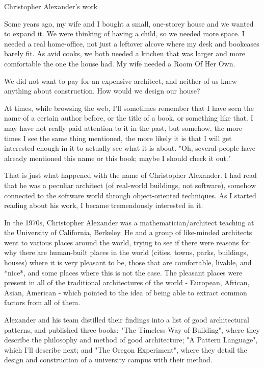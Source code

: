 Christopher Alexander's work

Some years ago, my wife and I bought a small, one-storey house and we wanted to expand it.  We were thinking of having a child, so we needed more space.  I needed a real home-office, not just a leftover alcove where my desk and bookcases barely fit.  As avid cooks, we both needed a kitchen that was larger and more comfortable the one the house had. My wife needed a Room Of Her Own.

We did not want to pay for an expensive architect, and neither of us knew anything about construction.  How would we design our house?

At times, while browsing the web, I'll sometimes remember that I have seen the name of a certain author before, or the title of a book, or something like that.  I may have not really paid attention to it in the past, but somehow, the more times I see the same thing mentioned, the more likely it is that I will get interested enough in it to actually see what it is about.  "Oh, several people have already mentioned this name or this book; maybe I should check it out."

That is just what happened with the name of Christopher Alexander.  I had read that he was a peculiar architect (of real-world buildings, not software), somehow connected to the software world through object-oriented techniques.  As I started reading about his work, I became tremendously interested in it.

In the 1970s, Christopher Alexander was a mathematician/architect teaching at the University of California, Berkeley.  He and a group of like-minded architects went to various places around the world, trying to see if there were reasons for why there are human-built places in the world (cities, towns, parks, buildings, houses) where it is very pleasant to be, those that are comfortable, livable, and *nice*, and some places where this is not the case.  The pleasant places were present in all of the traditional architectures of the world - European, African, Asian, American - which pointed to the idea of being able to extract common factors from all of them.

Alexander and his team distilled their findings into a list of good architectural patterns, and published three books:  "The Timeless Way of Building", where they describe the philosophy and method of good architecture; "A Pattern Language", which I'll describe next; and "The Oregon Experiment", where they detail the design and construction of a university campus with their method.

